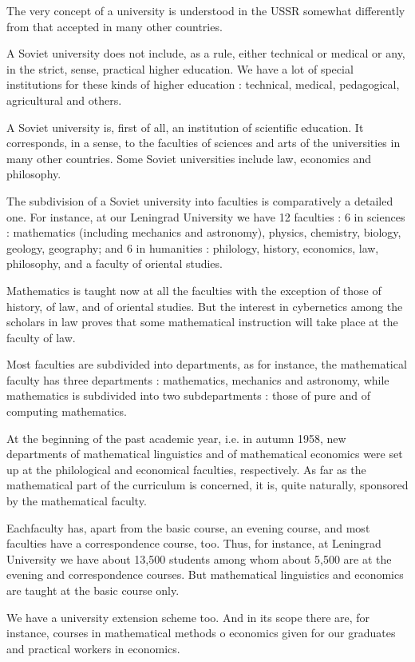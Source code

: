 The very concept of a university is understood in the USSR somewhat
differently from that accepted in many other countries.

A Soviet university does not include, as a rule, either technical or
medical or any, in the strict, sense, practical higher education. We
have a lot of special institutions for these kinds of higher education
: technical, medical, pedagogical, agricultural and others. 

A Soviet university is, first of all, an institution of scientific
education. It corresponds, in a sense, to the faculties of sciences
and arts of the universities in many other countries. Some Soviet
universities include law, economics and philosophy.

The subdivision of a Soviet university into faculties is comparatively
a detailed one. For instance, at our Leningrad University we have 12
faculties : 6 in sciences : mathematics (including mechanics and
astronomy), physics, chemistry, biology, geology, geography; and 6 in
humanities : philology, history, economics, law, philosophy, and a
faculty of oriental studies.

Mathematics is taught now at all the faculties with the exception of
those of history, of law, and of oriental studies. But the interest in
cybernetics among the scholars in law proves that some mathematical
instruction will take place at the faculty of law. 

Most faculties are subdivided into departments, as for instance, the
mathematical faculty has three departments : mathematics, mechanics
and astronomy, while mathematics is subdivided into two subdepartments
: those of pure and of computing mathematics. 

At the beginning of the past academic year, i.e. in autumn 1958, new
departments of mathematical linguistics and of mathematical economics
were set up at the philological and economical faculties,
respectively. As far as the mathematical part of the curriculum is
concerned, it is, quite naturally, sponsored by the mathematical
faculty. 

Each\pageoriginale faculty has, apart from the basic course, an
evening course, and most faculties have a correspondence course,
too. Thus, for instance, at Leningrad University we have about 13,500
students among whom about 5,500 are at the evening and correspondence
courses. But mathematical linguistics and economics are taught at the
basic course only.

We have a university extension scheme too. And in its scope there are,
for instance, courses in mathematical methods o economics given for
our graduates and practical workers in economics. 

